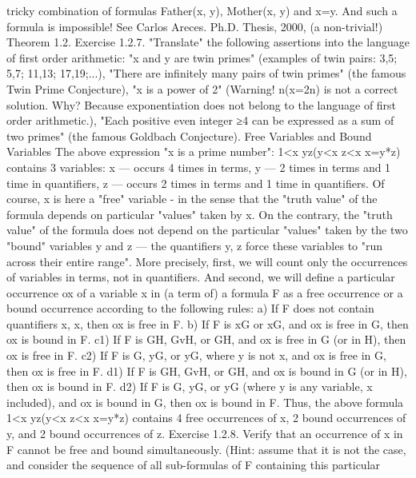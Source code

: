 tricky combination of formulas Father(x, y), Mother(x, y) and x=y. And such a formula is impossible! See
Carlos Areces. Ph.D. Thesis, 2000, (a non-trivial!) Theorem 1.2.
Exercise 1.2.7. "Translate" the following assertions into the language of first order arithmetic:
"x and y are twin primes" (examples of twin pairs: 3,5; 5,7; 11,13; 17,19;...),
"There are infinitely many pairs of twin primes" (the famous Twin Prime Conjecture),
"x is a power of 2" (Warning! \exists n(x=2n) is not a correct solution. Why? Because exponentiation does not
belong to the language of first order arithmetic.),
"Each positive even integer ≥4 can be expressed as a sum of two primes"
(the famous Goldbach Conjecture).
Free Variables and Bound Variables
The above expression "x is a prime number":
1<x \AND  \neg \exists y\exists z(y<x \AND  z<x \AND  x=y*z)
contains 3 variables: x --- occurs 4 times in terms, y --- 2 times in terms and 1 time in quantifiers, z --- occurs
2 times in terms and 1 time in quantifiers. Of course, x is here a "free" variable - in the sense that the
"truth value" of the formula depends on particular "values" taken by x. On the contrary, the "truth value"
of the formula does not depend on the particular "values" taken by the two "bound" variables y and z ---
the quantifiers \exists y, \exists z force these variables to "run across their entire range".
More precisely, first, we will count only the occurrences of variables in terms, not in quantifiers. And
second, we will define a particular occurrence ox of a variable x in (a term of) a formula F as a free
occurrence or a bound occurrence according to the following rules:
a) If F does not contain quantifiers \exists x, \forall x, then ox is free in F.
b) If F is \exists xG or \forall xG, and ox is free in G, then ox is bound in F.
c1) If F is G\AND H, GvH, or G\IMPLIES H, and ox is free in G (or in H), then ox is free in F.
c2) If F is \neg G, \exists yG, or \forall yG, where y is not x, and ox is free in G, then ox is free in F.
d1) If F is G\AND H, GvH, or G\IMPLIES H, and ox is bound in G (or in H), then ox is bound in F.
d2) If F is \neg G, \exists yG, or \forall yG (where y is any variable, x included), and ox is bound in G, then ox is bound
in F.
Thus, the above formula 1<x \AND  \neg \exists y\exists z(y<x \AND  z<x \AND  x=y*z) contains 4 free occurrences of x, 2 bound
occurrences of y, and 2 bound occurrences of z.
Exercise 1.2.8. Verify that an occurrence of x in F cannot be free and bound simultaneously. (Hint:
assume that it is not the case, and consider the sequence of all sub-formulas of F containing this particular

